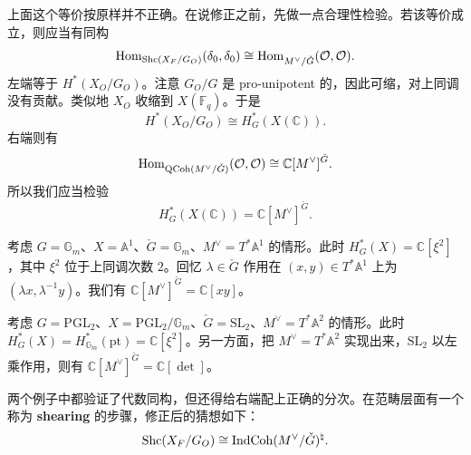 上面这个等价按原样并不正确。在说修正之前，先做一点合理性检验。若该等价成立，则应当有同构
\begin{equation}
  \operatorname{Hom}_{\mathrm{Shc}(X_F/G_O)}(\delta_0,\delta_0)\cong\operatorname{Hom}_{M^\vee/\check G}(\mathcal O,\mathcal O).
  \label{eq:11-13}
\end{equation}
左端等于 $H^*(X_O/G_O)$。注意 $G_O/G$ 是 pro-unipotent 的，因此可缩，对上同调没有贡献。类似地 $X_O$ 收缩到 $X(\mathbb F_q)$。于是
\begin{equation}
  H^*(X_O/G_O)\cong H^*_G(X(\mathbb C)).
  \label{eq:11-14}
\end{equation}
右端则有
\begin{equation}
  \operatorname{Hom}_{\operatorname{QCoh}(M^\vee/\check G)}(\mathcal O,\mathcal O)\cong\mathbb C[M^\vee]^{\check G}.
  \label{eq:11-15}
\end{equation}
所以我们应当检验
\begin{equation}
  H^*_G(X(\mathbb C))=\mathbb C[M^\vee]^{\check G}.
  \label{eq:11-16}
\end{equation}

\begin{exmp}
考虑 $G=\mathbb G_m$、$X=\mathbb A^1$、$\check G=\mathbb G_m$、$M^\vee=T^*\mathbb A^1$ 的情形。此时 $H^*_G(X)=\mathbb C[\xi^2]$，其中 $\xi^2$ 位于上同调次数 $2$。回忆 $\lambda\in\check G$ 作用在 $(x,y)\in T^*\mathbb A^1$ 上为 $(\lambda x,\lambda^{-1}y)$。我们有 $\mathbb C[M^\vee]^{\check G}=\mathbb C[xy]$。
\end{exmp}

\begin{exmp}
考虑 $G=\mathrm{PGL}_2$、$X=\mathrm{PGL}_2/\mathbb G_m$、$\check G=\mathrm{SL}_2$、$M^\vee=T^*\mathbb A^2$ 的情形。此时 $H^*_G(X)=H^*_{\mathbb G_m}(\mathrm{pt})=\mathbb C[\xi^2]$。另一方面，把 $M^\vee=T^*\mathbb A^2$ 实现出来，$\mathrm{SL}_2$ 以左乘作用，则有 $\mathbb C[M^\vee]^{\check G}=\mathbb C[\det]$。
\end{exmp}

两个例子中都验证了代数同构，但还得给右端配上正确的分次。在范畴层面有一个称为 \textbf{shearing} 的步骤，修正后的猜想如下：
\begin{equation}
  \mathrm{Shc}(X_F/G_O)\cong\operatorname{IndCoh}(M^\vee/\check G)^\natural.
  \label{eq:11-19}
\end{equation}
